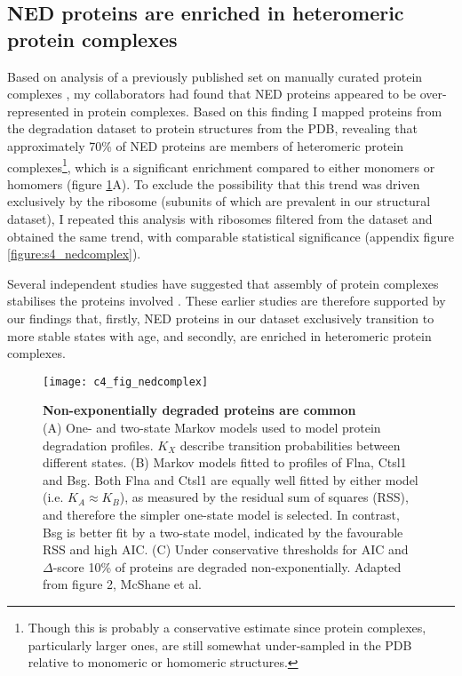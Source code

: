 \documentclass[a4paper,11pt,twoside,openright]{scrbook}
\begin{document}
\subsection{NED proteins are enriched in heteromeric protein complexes}

Based on analysis of a previously published set on manually curated protein complexes \cite{Ori2016}, my collaborators had found that NED proteins appeared to be over-represented in protein complexes. Based on this finding I mapped proteins from the degradation dataset to protein structures from the PDB, revealing that approximately 70\% of NED proteins are members of heteromeric protein complexes\footnote{Though this is probably a conservative estimate since protein complexes, particularly larger ones, are still somewhat under-sampled in the PDB relative to monomeric or homomeric structures.}, which is a significant enrichment compared to either monomers or homomers (figure \ref{figure:nedcomplex}A). To exclude the possibility that this trend was driven exclusively by the ribosome (subunits of which are prevalent in our structural dataset), I repeated this analysis with ribosomes filtered from the dataset and obtained the same trend, with comparable statistical significance (appendix figure \ref{figure:s4_nedcomplex}).

Several independent studies have suggested that assembly of protein complexes stabilises the proteins involved \cite{Goldberg2003,Malinverni2006,Toyama2013}. These earlier studies are therefore supported by our findings that, firstly, NED proteins in our dataset exclusively transition to more stable states with age, and secondly, are enriched in heteromeric protein complexes.


\begin{figure}
    \texttt{[image: c4\_fig\_nedcomplex]}
    \caption[Non-exponentially degraded proteins are common]{\sffamily \textbf{Non-exponentially degraded proteins are common} \\ \small (A) One- and two-state Markov models used to model protein degradation profiles. $K_{X}$ describe transition probabilities between different states. (B) Markov models fitted to profiles of Flna, Ctsl1 and Bsg. Both Flna and Ctsl1 are equally well fitted by either model (i.e. $K_{A} \approx K_{B}$), as measured by the residual sum of squares (RSS), and therefore the simpler one-state model is selected. In contrast, Bsg is better fit by a two-state model, indicated by the favourable RSS and high AIC. (C) Under conservative thresholds for AIC and $\Delta$-score 10\% of proteins are degraded non-exponentially. Adapted from figure 2, McShane et al.\cite{McShane2016}}
    \label{figure:nedcomplex}
\end{figure}
\end{document}

